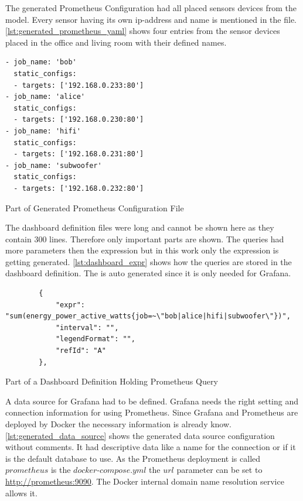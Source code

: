 The generated Prometheus Configuration had all placed sensors devices from the model. Every sensor having its own \gls{ip-address} and name is mentioned in the file. \cref{lst:generated_prometheus_yaml} shows four entries from the sensor devices placed in the office and living room with their defined names.

\begin{listing}[!ht]
	\begin{verbatim}
- job_name: 'bob'
  static_configs:
  - targets: ['192.168.0.233:80']
- job_name: 'alice'
  static_configs:
  - targets: ['192.168.0.230:80']
- job_name: 'hifi'
  static_configs:
  - targets: ['192.168.0.231:80']
- job_name: 'subwoofer'
  static_configs:
  - targets: ['192.168.0.232:80']
	\end{verbatim}
	\caption{Part of Generated Prometheus Configuration File}
	\label{lst:generated_prometheus_yaml}
\end{listing}

The dashboard definition files were long and cannot be shown here as they contain 300 lines. Therefore only important parts are shown. The queries had more parameters then the expression but in this work only the expression is getting generated. \cref{lst:dashboard_expr} shows how the queries are stored in the dashboard definition. The  is auto generated since it is only needed for Grafana.

\begin{listing}[!ht]
	\begin{verbatim}
		{
			"expr": "sum(energy_power_active_watts{job=~\"bob|alice|hifi|subwoofer\"})",
			"interval": "",
			"legendFormat": "",
			"refId": "A" 
		},
	\end{verbatim}
	\caption{Part of a Dashboard Definition Holding Prometheus Query}
	\label{lst:dashboard_expr}
\end{listing}

A data source for Grafana had to be defined. Grafana needs the right setting and connection information for using Prometheus. Since Grafana and Prometheus are deployed by Docker the necessary information is already know. \cref{lst:generated_data_source} shows the generated data source configuration without comments. It had descriptive data like a name for the connection or if it is the default database to use. As the Prometheus deployment is called $prometheus$ is the $docker\text{-}compose.yml$ the $url$ parameter can be set to \url{http://prometheus:9090}. The Docker internal domain name resolution service allows it.

